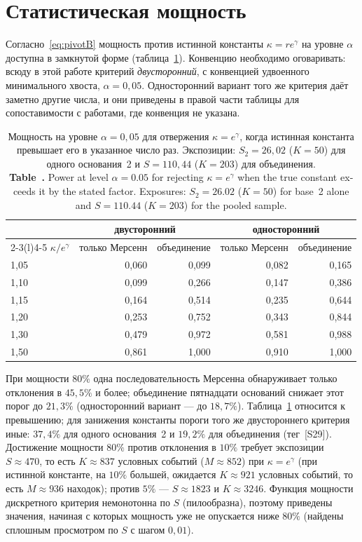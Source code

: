 \documentclass[11pt,a4paper]{article}
\newcommand{\encaptab}[1]{\\[3pt]\foreignlanguage{english}{%
  \textbf{Table~\thetable.} #1}}
\theoremstyle{plain}
\theoremstyle{remark}
\newcommand{\eg}{e^{\gamma}}
\begin{document}
\section{Статистическая мощность}\label{sec:power}

Согласно~\eqref{eq:pivotB} мощность против истинной константы $\kappa=r\eg$ на уровне
$\alpha$ доступна в замкнутой форме (таблица~\ref{tab:power}). Конвенцию необходимо
оговаривать: всюду в этой работе критерий \emph{двусторонний}, с конвенцией
удвоенного минимального хвоста, $\alpha=0{,}05$. Односторонний вариант того же
критерия даёт заметно другие числа, и они приведены в правой части таблицы для
сопоставимости с работами, где конвенция не указана.

\begin{table}[t]
\centering
\caption{Мощность на уровне $\alpha=0{,}05$ для отвержения $\kappa=\eg$, когда истинная
константа превышает его в указанное число раз. Экспозиции: $S_2=26{,}02$ ($K=50$)
для одного основания~2 и $S=110{,}44$ ($K=203$) для объединения.
\encaptab{Power at level $\alpha=0.05$ for rejecting $\kappa=\eg$ when the true
constant exceeds it by the stated factor. Exposures: $S_2=26.02$ ($K=50$) for base~2
alone and $S=110.44$ ($K=203$) for the pooled sample.}}
\label{tab:power}
\small
\begin{tabular}{lrr@{\qquad}rr}
\toprule
& \multicolumn{2}{c}{двусторонний} & \multicolumn{2}{c}{односторонний}\\
\cmidrule(r){2-3}\cmidrule(l){4-5}
$\kappa/\eg$ & только Мерсенн & объединение & только Мерсенн & объединение\\
\midrule
1{,}05 & 0{,}060 & 0{,}099 & 0{,}082 & 0{,}165\\
1{,}10 & 0{,}099 & 0{,}266 & 0{,}147 & 0{,}386\\
1{,}15 & 0{,}164 & 0{,}514 & 0{,}235 & 0{,}644\\
1{,}20 & 0{,}253 & 0{,}752 & 0{,}343 & 0{,}844\\
1{,}30 & 0{,}479 & 0{,}972 & 0{,}581 & 0{,}988\\
1{,}50 & 0{,}861 & 1{,}000 & 0{,}910 & 1{,}000\\
\bottomrule
\end{tabular}
\end{table}

При мощности $80\%$ одна последовательность Мерсенна обнаруживает только отклонения
в $45{,}5\%$ и более; объединение пятнадцати оснований снижает этот порог до $21{,}3\%$
(односторонний вариант --- до $18{,}7\%$). Таблица~\ref{tab:power} относится к
превышению; для занижения константы пороги того же двустороннего критерия иные:
$37{,}4\%$ для одного основания~2 и $19{,}2\%$ для объединения (тег~[S29]).
Достижение мощности $80\%$ против отклонения в $10\%$ требует экспозиции
$S\approx470$, то есть $K\approx837$ условных событий ($M\approx852$) при
$\kappa=\eg$ (при истинной константе, на $10\%$ большей, ожидается $K\approx921$
условных событий, то есть $M\approx936$ находок);
против $5\%$ --- $S\approx1823$ и $K\approx3246$. Функция мощности дискретного
критерия немонотонна по $S$ (пилообразна), поэтому приведены значения, начиная
с которых мощность уже не опускается ниже $80\%$ (найдены сплошным просмотром по
$S$ с шагом $0{,}01$).
\end{document}
